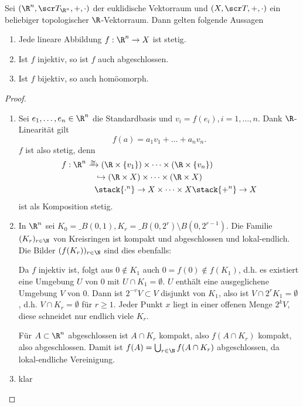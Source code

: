 \begin{st} \label{st:euclidean_linear_space_topological_space_linear_function}
	Sei $(\R^n, \scr T_{\R^n}, +, \cdot)$ der euklidische Vektorraum und $(X, \scr T, +, \cdot)$ ein beliebiger topologischer $\R$-Vektorraum.
	Dann gelten folgende Aussagen
	\begin{enumerate}[1)]
		\item
			Jede lineare Abbildung $f: \R^n \to X$ ist stetig.
		\item
			Ist $f$ injektiv, so ist $f$ auch abgeschlossen.
		\item
			Ist $f$ bijektiv, so auch homöomorph.
	\end{enumerate}
	\begin{proof}
		\begin{enumerate}[(1)]
			\item
				Sei $e_1, \dotsc, e_n \in \R^n$ die Standardbasis und $v_i = f(e_i), i=1, \dotsc, n$.
				Dank $\R$-Linearität gilt
				\[
					f(a) = a_1 v_1 + \dotsc + a_n v_n.
				\]
				$f$ ist also stetig, denn
				\begin{align*}
					f:
					\R^n &\homto (\R \times \{v_1\}) \times \dotsb \times (\R \times \{v_n\}) \\
					&\quad\injto (\R \times X) \times \dotsb \times (\R \times X) \\
					&\quad\stack{\cdot^n}\to X \times \dotsb \times X
					\stack{+^n}\to X
				\end{align*}
				ist als Komposition stetig.
			\item
				In $\R^n$ sei $K_0 = \_B(0,1), K_r = \_B(0,2^r) \setminus B(0,2^{r-1})$.
				Die Familie $(K_r)_{r\in\N}$ von Kreisringen ist kompakt und abgeschlossen und lokal-endlich.
				Die Bilder $(f(K_r))_{r\in\N}$ sind dies ebenfalls:

				Da $f$ injektiv ist, folgt aus $0 \not\in K_1$ auch $0 = f(0) \not\in f(K_1)$, d.h. es existiert eine Umgebung $U$ von $0$ mit $U \cap K_1 = \emptyset$.
				$U$ enthält eine ausgeglichene Umgebung $V$ von $0$.
				Dann ist $2^{-v}V \subset V$ disjunkt von $K_1$, also ist $V \cap 2^r K_1 = \emptyset$, d.h. $V \cap K_r = \emptyset$ für $r \ge 1$.
				Jeder Punkt $x$ liegt in einer offenen Menge $2^k V$, diese schneidet nur endlich viele $K_r$.

				Für $A \subset \R^n$ abgeschlossen ist $A \cap K_r$ kompakt, also $f(A \cap K_r)$ kompakt, also abgeschlossen.
				Damit ist $f(A) = \bigcup_{r\in\N} f(A \cap K_r)$ abgeschlossen, da lokal-endliche Vereinigung.
			\item
				klar
		\end{enumerate}
	\end{proof}
\end{st}

